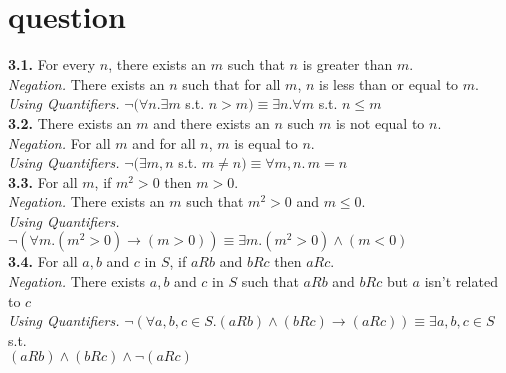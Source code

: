 \documentclass[11pt]{article}
\begin{document}
\section{question}
\textbf{3.1. } For every $n$, there exists an $m$ such that $n$ is greater than $m$. \\
\text{  }   \qquad  \emph{Negation. } There exists an $n$ such that for all $m$, $n$ is less than or equal to $m$. \\
\text{  }   \qquad  \emph{Using Quantifiers. } $\neg(\forall n. \exists m$ s.t. $n>m) \equiv {\exists n. \forall m}$ s.t. ${n \leq m}$ \medskip \\
\textbf{3.2. } There exists an $m$ and there exists an $n$ such $m$ is not equal to $n$. \\
\text{  }   \qquad  \emph{Negation. } For all $m$ and for all $n$, $m$ is equal to $n$. \\
\text{  }   \qquad  \emph{Using Quantifiers. } $\neg(\exists m, n$ s.t. $m \neq n) \equiv \forall m, n. \, m = n$ \medskip \\
\textbf{3.3. } For all $m$, if $m^2 > 0$ then $m > 0$. \\
\text{  }   \qquad  \emph{Negation. } There exists an $m$ such that $m^2 > 0$ and $m \leq 0$.  \\
\text{  }   \qquad  \emph{Using Quantifiers. } $\neg(\forall m. (m^2 > 0 ) \rightarrow (m > 0)) \equiv \exists m. (m^2 > 0) \land (m < 0)$ \medskip \\
\textbf{3.4. } For all $a, b$ and $c$ in $S$, if $a R b$ and $b R c$ then $a R c$.\\
\text{  }   \qquad  \emph{Negation. } There exists $a, b$ and $c$ in $S$ such that $a R b$ and $b R c$ but $a$ isn't related to $c$ \\
\text{  }   \qquad  \emph{Using Quantifiers. }$\neg(\forall a, b, c \in S. (a R b) \land (b R c) \rightarrow (a R c)) \equiv \exists a, b, c \in S$ s.t.
\\ \text{  } \qquad $(a R b) \land (b R c) \land \neg(a R c)$ 

\end{document}
